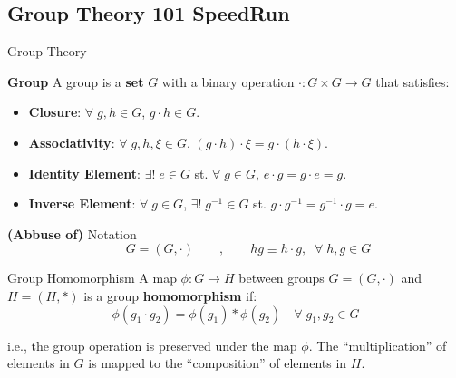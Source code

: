 \documentclass[9pt,dvipsnames]{beamer}
\begin{document}
\subsection{Group Theory 101 SpeedRun}
\begin{frame}{Group Theory}

	\begin{block}{\bf Group}
		A group is a {\color{red}\textbf{set}} $G$ with a binary operation $\cdot: G \times G \to G$ that satisfies:
		\begin{itemize}
			\item \textbf{Closure}: $\forall \; g, h \in G$, $g \cdot h \in G$.
			\item \textbf{Associativity}: $\forall \; g, h, \xi \in G$, $(g \cdot h) \cdot\xi = g \cdot (h \cdot \xi)$.
			\item \textbf{Identity Element}: $\exists! \; e \in G$ st. $\forall \; g \in G$, $e \cdot g = g \cdot e = g$.
			\item \textbf{Inverse Element}: $\forall \; g \in G$, $\exists! \; g^{-1} \in G$ st. $g \cdot g^{-1} = g^{-1} \cdot g = e$.
		\end{itemize}
	\end{block}

	\begin{alertblock}{\textbf{(Abbuse of)} Notation}
		\begin{equation*}
			\qquad G = (G, \cdot) \qquad , \qquad hg \equiv h \cdot g, \;\; \forall \; h, g \in G
		\end{equation*}
	\end{alertblock}

	\begin{block}{Group Homomorphism}
		A map $\phi: G \to H$ between groups $G = (G, \cdot)$ and $H = (H, *)$ is a group \textbf{homomorphism} if:
		\begin{equation*}
			\phi(g_1 \cdot g_2) = \phi(g_1) * \phi(g_2) \quad \forall \; g_1, g_2 \in G
		\end{equation*}
	\end{block}

	i.e., the group operation is preserved under the map $\phi$. The ``multiplication'' of elements in $G$ is mapped to the ``composition'' of elements in $H$.

\end{frame}
\end{document}
